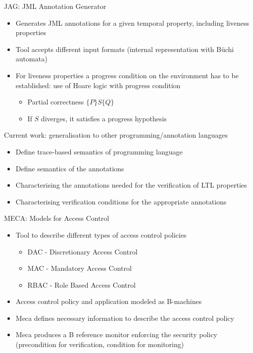 \documentclass[final,nocolorBG,a4,marieke,nototal,ps, accumulate,slideColor]{prosper}
\begin{document}
\begin{slide}{JAG: JML Annotation Generator}
\begin{itemize}
\item Generates JML annotations for a given temporal property,
including liveness properties
\item Tool accepts different input formats (internal representation
with B\"uchi automata)
\item For liveness properties a progress condition on the environment
has to be established: use of Hoare logic with progress condition
\Red{\[\{|P|\}S\{|Q|\}\]}
\vspace*{-1em}
\begin{itemize}
\item Partial correctness \(\{P\}S\{Q\}\)
\item If \(S\) diverges, it satisfies a progress hypothesis
\end{itemize}
\end{itemize}
\end{slide}

\begin{slide}{Current work: generalisation to other
programming/annotation languages}
\begin{itemize}
\item Define trace-based semantics of programming language
\item Define semantics of the annotations
\item Characterising the annotations needed for the verification of
LTL properties
\item Characterising verification conditions for the appropriate
annotations
\end{itemize}
\end{slide}

\begin{slide}{MECA: Models for Access Control}
\begin{itemize}
\item Tool to describe different types of access control policies 
\begin{itemize}
\item DAC - Discretionary Access Control
\item MAC - Mandatory Access Control  
\item RBAC - Role Based Access Control
\end{itemize}


\item Access control policy and application modeled as B-machines
\item Meca defines necessary information to describe the
access control policy
\item Meca produces a B reference monitor enforcing the security policy 
(precondition for verification, condition for monitoring)
\end{itemize}
\end{slide}
\end{document}
